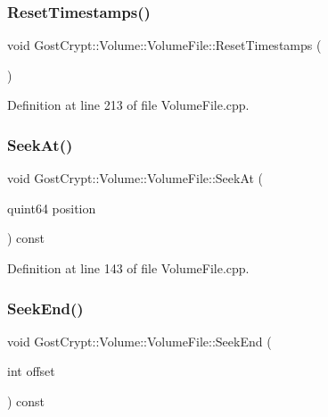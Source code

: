 \subsubsection{\texorpdfstring{Reset\+Timestamps()}{ResetTimestamps()}}
{\footnotesize\ttfamily void Gost\+Crypt\+::\+Volume\+::\+Volume\+File\+::\+Reset\+Timestamps (\begin{DoxyParamCaption}{ }\end{DoxyParamCaption})}



Definition at line 213 of file Volume\+File.\+cpp.

\mbox{\label{class_gost_crypt_1_1_volume_1_1_volume_file_a9c54f29956e49f4c1cd72827343baf08}} 
\subsubsection{\texorpdfstring{Seek\+At()}{SeekAt()}}
{\footnotesize\ttfamily void Gost\+Crypt\+::\+Volume\+::\+Volume\+File\+::\+Seek\+At (\begin{DoxyParamCaption}\item[{quint64}]{position }\end{DoxyParamCaption}) const}



Definition at line 143 of file Volume\+File.\+cpp.

\mbox{\label{class_gost_crypt_1_1_volume_1_1_volume_file_a06be8984a77477f80a48cfff993a82d9}} 
\subsubsection{\texorpdfstring{Seek\+End()}{SeekEnd()}}
{\footnotesize\ttfamily void Gost\+Crypt\+::\+Volume\+::\+Volume\+File\+::\+Seek\+End (\begin{DoxyParamCaption}\item[{int}]{offset }\end{DoxyParamCaption}) const}



